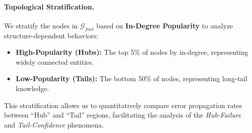 \paragraph{Topological Stratification.}
We stratify the nodes in $\mathcal{G}_{fact}$ based on \textbf{In-Degree Popularity} to analyze structure-dependent behaviors:
\begin{itemize}
    \setlength\itemsep{0em} %
    \item \textbf{High-Popularity (Hubs):} The top 5\% of nodes by in-degree, representing widely connected entities.
    \item \textbf{Low-Popularity (Tails):} The bottom 50\% of nodes, representing long-tail knowledge.
\end{itemize}
This stratification allows us to quantitatively compare error propagation rates between ``Hub'' and ``Tail'' regions, facilitating the analysis of the \textit{Hub-Failure} and \textit{Tail-Confidence} phenomena.
